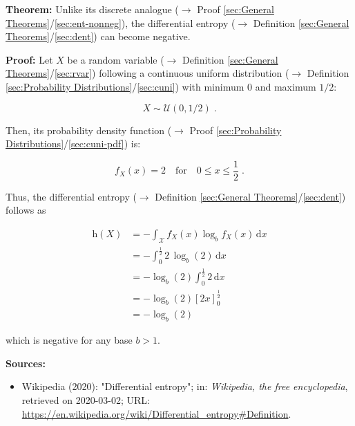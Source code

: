 \documentclass[a4paper,12pt,twoside]{book}
\begin{document}
\textbf{Theorem:} Unlike its discrete analogue ($\rightarrow$ Proof \ref{sec:General Theorems}/\ref{sec:ent-nonneg}), the differential entropy ($\rightarrow$ Definition \ref{sec:General Theorems}/\ref{sec:dent}) can become negative.


\vspace{1em}
\textbf{Proof:} Let $X$ be a random variable ($\rightarrow$ Definition \ref{sec:General Theorems}/\ref{sec:rvar}) following a continuous uniform distribution ($\rightarrow$ Definition \ref{sec:Probability Distributions}/\ref{sec:cuni}) with minimum $0$ and maximum $1/2$:

\begin{equation} \label{eq:dent-neg-X}
X \sim \mathcal{U}(0, 1/2) \; .
\end{equation}

Then, its probability density function ($\rightarrow$ Proof \ref{sec:Probability Distributions}/\ref{sec:cuni-pdf}) is:

\begin{equation} \label{eq:dent-neg-X-pdf}
f_X(x) = 2 \quad \text{for} \quad 0 \leq x \leq \frac{1}{2} \; .
\end{equation}

Thus, the differential entropy ($\rightarrow$ Definition \ref{sec:General Theorems}/\ref{sec:dent}) follows as

\begin{equation} \label{eq:dent-neg-X-dent}
\begin{split}
\mathrm{h}(X) &= - \int_{\mathcal{X}} f_X(x) \log_b f_X(x) \, \mathrm{d}x \\
&= - \int_{0}^{\frac{1}{2}} 2 \, \log_b(2) \, \mathrm{d}x \\
&= -\log_b(2) \int_{0}^{\frac{1}{2}} 2 \, \mathrm{d}x \\
&= -\log_b(2) \left[ 2x \right]_{0}^{\frac{1}{2}} \\
&= -\log_b(2)
\end{split}
\end{equation}

which is negative for any base $b > 1$.


\vspace{1em}
\textbf{Sources:}
\begin{itemize}
\item Wikipedia (2020): "Differential entropy"; in: \textit{Wikipedia, the free encyclopedia}, retrieved on 2020-03-02; URL: \url{https://en.wikipedia.org/wiki/Differential_entropy#Definition}.
\end{itemize}
\end{document}
